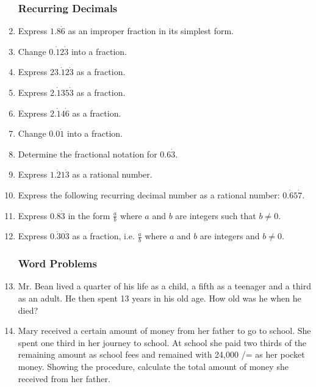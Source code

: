 \begin{enumerate}
		\subsubsection{Recurring Decimals}	 
	 
	 \item Express $1.8\dot{6}$ as an improper fraction in its simplest form.
	 
	 \item Change $0.\dot{1}2\dot{3}$ into a fraction.
	 
	 \item Express $23.\dot{1}2\dot{3}$ as a fraction.
	 
	 \item Express $2.\dot{1}35\dot{3}$ as a fraction.
	 
	 \item Express $2.\dot{1}4\dot{6}$ as a fraction.
	 
	 \item Change $0.0\dot{1}$ into a fraction.
	 
	 \item Determine the fractional notation for $0.6\dot{3}$.
	 
	 \item Express $1.\dot{2}1\dot{3}$ as a rational number.
	
	\item Express the following recurring decimal number as a rational number: $0.\dot{6}5\dot{7}$.
	 
	 \item Express $0.8\dot{3}$ in the form $\frac{a}{b}$ where $a$ and $b$ are integers such that $b \neq 0$.
	 
	 \item Express $0.\dot{3}0\dot{3}$ as a fraction, i.e. $\frac{a}{b}$ where $a$ and $b$ are integers and $b \neq 0$.

			\subsubsection{Word Problems}
	\item Mr. Bean lived a quarter of his life as a child, a fifth as a teenager and a third as an adult. He then spent 13 years in his old age. How old was he when he died?	
			
	\item Mary received a certain amount of money from her father to go to school. She spent one third in her journey to school. At school she paid two thirds of the remaining amount as school fees and remained with 24,000 /= as her pocket money. Showing the procedure, calculate the total amount of money she received from her father. 
			

\end{enumerate}
